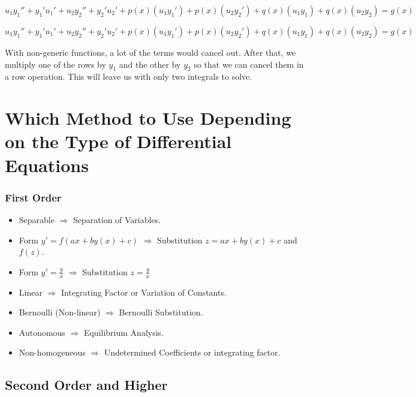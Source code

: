 \[
    u_1 y_{1}'' + y_{1}' u_{1}'  + u_2 y_{2}'' + y_{2}' u_{2}' + p(x)(u_1 y_{1}') + p(x)(u_2 y_{2}')
    + q(x)(u_1 y_1) + q(x)(u_2 y_2) = g(x)
\]

\[
    u_1 y_{1}'' + y_{1}' u_{1}'  + u_2 y_{2}'' + y_{2}' u_{2}' + p(x)(u_1 y_{1}') + p(x)(u_2 y_{2}')
    + q(x)(u_1 y_1) + q(x)(u_2 y_2) = g(x)
\]

With non-generic functions, a lot of the terms would cancel out. After that, we multiply one of the rows
by \(y_1\) and the other by \(y_2\) so that we can cancel them in a row operation. This will leave us
with only two integrals to solve.

\section{Which Method to Use Depending on the Type of Differential Equations}

\subsubsection{First Order}

\begin{itemize}

    \item Separable \(\Rightarrow\) Separation of Variables.

    \item Form \(y' = f(ax + by(x) + c)\) \(\Rightarrow\) Substitution \(z = ax + by(x) + c\) and \(f(z)\).

    \item Form \(y' = \frac{y}{x}\) \(\Rightarrow\) Substitution \(z = \frac{y}{x}\)

    \item Linear \(\Rightarrow\) Integrating Factor or Variation of Constants.

    \item Bernoulli (Non-linear) \(\Rightarrow\) Bernoulli Substitution.

    \item Autonomous \(\Rightarrow\) Equilibrium Analysis.

    \item Non-homogeneous \(\Rightarrow\) Undetermined Coefficients or integrating factor.

\end{itemize}

\subsection{Second Order and Higher}

